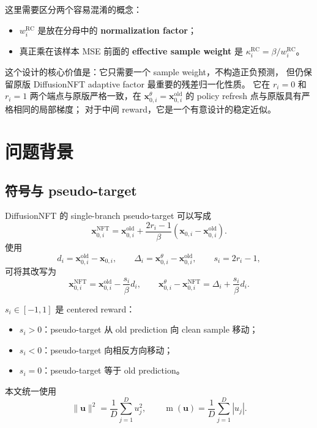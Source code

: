 \documentclass[11pt,a4paper]{article}
\newcommand{\mabs}{\operatorname{m}}
\newcommand{\xcur}{\mathbf{x}_{0,i}^{\theta}}
\newcommand{\xold}{\mathbf{x}_{0,i}^{\mathrm{old}}}
\newcommand{\xclean}{\mathbf{x}_{0,i}}
\newcommand{\xtarget}{\mathbf{x}_{0,i}^{\mathrm{NFT}}}
\newcommand{\R}{\mathrm{RC}}
\begin{document}
这里需要区分两个容易混淆的概念：
\begin{itemize}
  \item $w_i^{\R}$ 是放在分母中的 \textbf{normalization factor}；
  \item 真正乘在该样本 MSE 前面的 \textbf{effective sample weight} 是
  $\kappa_i^{\R}=\beta/w_i^{\R}$。
\end{itemize}

这个设计的核心价值是：它只需要一个 sample weight，不构造正负预测，
但仍保留原版 DiffusionNFT adaptive factor 最重要的残差归一化性质。
它在 $r_i=0$ 和 $r_i=1$ 两个端点与原版严格一致，在
$\xcur=\xold$ 的 policy refresh 点与原版具有严格相同的局部梯度；
对于中间 reward，它是一个有意设计的稳定近似。

\section{问题背景}

\subsection{符号与 pseudo-target}

DiffusionNFT 的 single-branch pseudo-target 可以写成
\begin{equation}
\xtarget
=
\xold
+
\frac{2r_i-1}{\beta}
\left(\xclean-\xold\right).
\label{eq:pseudo-target}
\end{equation}
使用
\begin{equation}
d_i=\xold-\xclean,
\qquad
\Delta_i=\xcur-\xold,
\qquad
s_i=2r_i-1,
\end{equation}
可将其改写为
\begin{equation}
\xtarget=\xold-\frac{s_i}{\beta}d_i,
\qquad
\xcur-\xtarget
=
\Delta_i+\frac{s_i}{\beta}d_i.
\label{eq:target-residual}
\end{equation}

$s_i\in[-1,1]$ 是 centered reward：
\begin{itemize}
  \item $s_i>0$：pseudo-target 从 old prediction 向 clean sample 移动；
  \item $s_i<0$：pseudo-target 向相反方向移动；
  \item $s_i=0$：pseudo-target 等于 old prediction。
\end{itemize}

本文统一使用
\begin{equation}
\|\mathbf{u}\|^2=\frac{1}{D}\sum_{j=1}^{D}u_j^2,
\qquad
\mabs(\mathbf{u})=\frac{1}{D}\sum_{j=1}^{D}|u_j|.
\end{equation}
\end{document}
